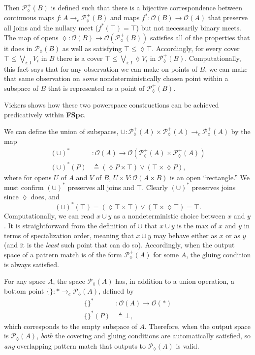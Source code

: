 \documentclass[conference]{IEEEtran}
\newcommand{\PLower}{\mathcal{P}_\lozenge}
\newcommand{\cto}{\to_c}
\newcommand{\One}{\ast}
\newcommand{\Open}[1]{\mathcal{O}({#1})}
\newcommand{\isthemaxof}[3]{{#1}\text{ is the max of }{#2}\text{ and }{#3}}
\newcommand{\iimg}[1]{#1^*}
\begin{document}
Then $\PLower^+(B)$ is defined such that there is a bijective correspondence between continuous maps $f : A \cto \PLower^+(B)$ and maps $\iimg{f} : \Open{B} \to \Open{A}$ that preserve all joins and the nullary meet ($\iimg{f}(\top) = \top$) but not necessarily binary meets. The map of opens $\lozenge : \Open{B} \to \Open{\PLower^+(B)}$ satisfies all of the properties that it does in $\PLower(B)$ as well as satisfying
$\top \le \lozenge \top$. Accordingly, for every cover $\top \le \bigvee_{i : I} V_i$ in $B$ there is a cover $\top \le \bigvee_{i : I} \lozenge V_i$ in $\PLower^+(B)$. Computationally, this fact says that for any observation we can make on points of $B$, we can make that same observation on \emph{some} nondeterministically chosen point within a subspace of $B$ that is represented as a point of $\PLower^+(B)$.

Vickers \cite{vickersdoublepowerlocale} shows how these two powerspace constructions can be achieved predicatively within \textbf{FSpc}. 

We can define the union of subspaces, $
\cup : \PLower^+(A) \times \PLower^+(A) \cto \PLower^+(A)$ by the map
\begin{align*}
\iimg{(\cup)} &: \Open{A} \to \Open{\PLower^+(A) \times \PLower^+(A)}
\\ \iimg{(\cup)}(P) &\triangleq (\lozenge P \times \top) \vee (\top \times \lozenge P),
\end{align*}
where for opens $U$ of $A$ and $V$ of $B$, $U \times V : \Open{A \times B}$ is an open ``rectangle.''
We must confirm $\iimg{(\cup)}$ preserves all joins and $\top$. Clearly $\iimg{(\cup)}$ preserves joins since $\lozenge$ does, and
\[
\iimg{(\cup)}(\top) = (\lozenge \top \times \top) \vee (\top \times \lozenge \top) = \top.
\]
Computationally, we can read $x \cup y$ as a nondeterministic choice between $x$ and $y$.
It is straightforward from the definition of $\cup$ that $\isthemaxof{x \cup y}{x}{y}$ in terms of specialization order, meaning that $x \cup y$ may behave either as $x$ or as $y$ (and it is the \emph{least} such point that can do so). Accordingly, when the output space of a pattern match is of the form $\PLower^+(A)$ for some $A$, the gluing condition is always satisfied.

For any space $A$, the space $\PLower(A)$ has, in addition to a union operation, a bottom point $\{ \} : \One \cto \PLower(A)$, defined by
\begin{align*}
\iimg{\{\}} &: \Open{A} \to \Open{\One}
\\ \iimg{\{ \}}(P) &\triangleq \bot,
\end{align*}
which corresponds to the empty subspace of $A$. Therefore, when the output space is $\PLower(A)$, \emph{both} the covering and gluing conditions are automatically satisfied, so \emph{any} overlapping pattern match that outputs to $\PLower(A)$ is valid.
\end{document}
